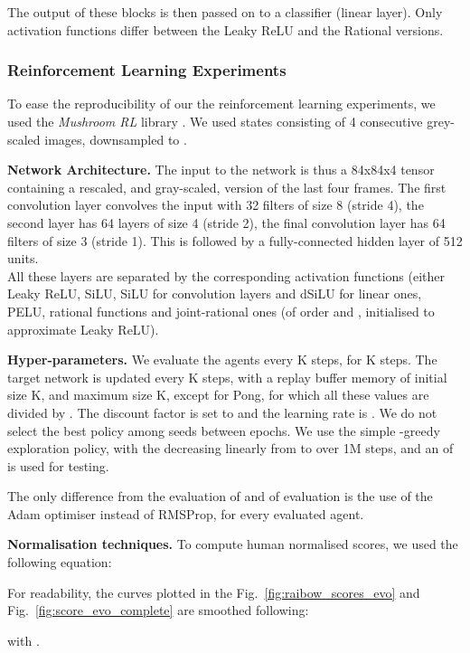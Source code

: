 \documentclass[accepted]{article}
\theoremstyle{plain}
\theoremstyle{definition}
\theoremstyle{remark}
\begin{document}
The output of these blocks is then passed on to a classifier (linear layer). Only activation functions differ between the Leaky ReLU and the Rational versions.

\subsubsection{Reinforcement Learning Experiments}
\label{app:details_rl}
To ease the reproducibility of our the reinforcement learning experiments, we used the \textit{Mushroom RL} library \citep{deramo2020mushroomrl}. We used states consisting of 4 consecutive grey-scaled images, downsampled to .

\textbf{Network Architecture.}
The input to the network is thus a 84x84x4 tensor containing a rescaled, and gray-scaled, version of the last four frames. The first convolution layer convolves the input with 32 filters of size 8 (stride 4), the second layer has 64 layers of size 4 (stride 2), the final convolution layer has 64 filters of size 3 (stride 1). This is followed by a fully-connected hidden layer of 512 units. \\
All these layers are separated by the corresponding activation functions (either Leaky ReLU, SiLU, SiLU for convolution layers and dSiLU for linear ones, PELU, rational functions and joint-rational ones (of order  and , initialised to approximate Leaky ReLU). 

\textbf{Hyper-parameters.}
We evaluate the agents every K steps, for K steps. The target network is updated every K steps, with a replay buffer memory of initial size K, and maximum size K, except for Pong, for which all these values are divided by . The discount factor  is set to  and the learning rate is . We do not select the best policy among seeds between epochs. We use the simple -greedy exploration policy, with the  decreasing linearly from  to  over 1M steps, and an  of  is used for testing.

The only difference from the evaluation of \cite{mnih2015human} and of \cite{van2016deep} evaluation is the use of the Adam optimiser instead of RMSProp, for every evaluated agent.

\textbf{Normalisation techniques.}
To compute human normalised scores, we used the following equation:



For readability, the curves plotted in the Fig.~\ref{fig:raibow_scores_evo} and Fig.~\ref{fig:score_evo_complete} are smoothed following:

with .
\end{document}

